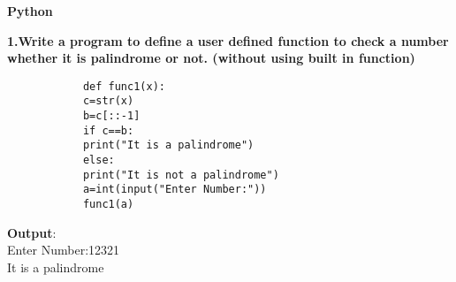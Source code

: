 \documentclass[
a4paper]{article}
\begin{document}
	\begin{center}
		\centering\LARGE\bfseries Python
	\end{center}
	\begin{large}
		\textbf{1.Write a program to define a user defined function to check a number
			whether it is palindrome or not. (without using built in function)}
		
		\begin{verbatim}
			def func1(x):
			c=str(x)
			b=c[::-1]
			if c==b:
			print("It is a palindrome")
			else:
			print("It is not a palindrome")
			a=int(input("Enter Number:"))
			func1(a)
		\end{verbatim}
		\textbf{Output}:\\
		Enter Number:12321\\
		It is a palindrome
		

\end{large}
\end{document}
